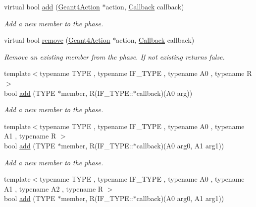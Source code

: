 \begin{DoxyCompactItemize}
virtual bool \hyperlink{class_d_d4hep_1_1_simulation_1_1_geant4_action_phase_a61f8e3266a3e0f059539479fd335bb08}{add} (\hyperlink{class_d_d4hep_1_1_simulation_1_1_geant4_action}{Geant4\+Action} $\ast$action, \hyperlink{class_d_d4hep_1_1_callback}{Callback} callback)
\begin{DoxyCompactList}\small\item\em Add a new member to the phase. \end{DoxyCompactList}\item 
virtual bool \hyperlink{class_d_d4hep_1_1_simulation_1_1_geant4_action_phase_aac2407103c62385824359ff8fa680f48}{remove} (\hyperlink{class_d_d4hep_1_1_simulation_1_1_geant4_action}{Geant4\+Action} $\ast$action, \hyperlink{class_d_d4hep_1_1_callback}{Callback} callback)
\begin{DoxyCompactList}\small\item\em Remove an existing member from the phase. If not existing returns false. \end{DoxyCompactList}\item 
{\footnotesize template$<$typename T\+Y\+PE , typename I\+F\+\_\+\+T\+Y\+PE , typename A0 , typename R $>$ }\\bool \hyperlink{class_d_d4hep_1_1_simulation_1_1_geant4_action_phase_ac5f83b6eac8a29459e85cfcad61db876}{add} (T\+Y\+PE $\ast$member, R(I\+F\+\_\+\+T\+Y\+P\+E\+::$\ast$callback)(A0 arg))
\begin{DoxyCompactList}\small\item\em Add a new member to the phase. \end{DoxyCompactList}\item 
{\footnotesize template$<$typename T\+Y\+PE , typename I\+F\+\_\+\+T\+Y\+PE , typename A0 , typename A1 , typename R $>$ }\\bool \hyperlink{class_d_d4hep_1_1_simulation_1_1_geant4_action_phase_a0a10762619fbba6996d9ac17f6141f8c}{add} (T\+Y\+PE $\ast$member, R(I\+F\+\_\+\+T\+Y\+P\+E\+::$\ast$callback)(A0 arg0, A1 arg1))
\begin{DoxyCompactList}\small\item\em Add a new member to the phase. \end{DoxyCompactList}\item 
{\footnotesize template$<$typename T\+Y\+PE , typename I\+F\+\_\+\+T\+Y\+PE , typename A0 , typename A1 , typename A2 , typename R $>$ }\\bool \hyperlink{class_d_d4hep_1_1_simulation_1_1_geant4_action_phase_a3c3f2f64c43945010765cfeea42a43f8}{add} (T\+Y\+PE $\ast$member, R(I\+F\+\_\+\+T\+Y\+P\+E\+::$\ast$callback)(A0 arg0, A1 arg1))

\end{DoxyCompactItemize}
